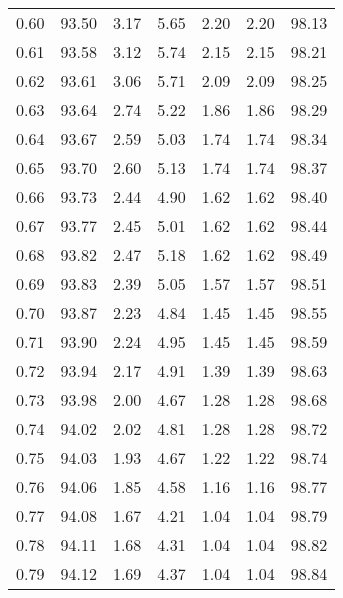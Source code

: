 \begin{tabular}{|c|c|c|c|c|c|c|}
      0.60 &     93.50 &      3.17 &       5.65 &    2.20 &       2.20 &         98.13 \\
      0.61 &     93.58 &      3.12 &       5.74 &    2.15 &       2.15 &         98.21 \\
      0.62 &     93.61 &      3.06 &       5.71 &    2.09 &       2.09 &         98.25 \\
      0.63 &     93.64 &      2.74 &       5.22 &    1.86 &       1.86 &         98.29 \\
      0.64 &     93.67 &      2.59 &       5.03 &    1.74 &       1.74 &         98.34 \\
      0.65 &     93.70 &      2.60 &       5.13 &    1.74 &       1.74 &         98.37 \\
      0.66 &     93.73 &      2.44 &       4.90 &    1.62 &       1.62 &         98.40 \\
      0.67 &     93.77 &      2.45 &       5.01 &    1.62 &       1.62 &         98.44 \\
      0.68 &     93.82 &      2.47 &       5.18 &    1.62 &       1.62 &         98.49 \\
      0.69 &     93.83 &      2.39 &       5.05 &    1.57 &       1.57 &         98.51 \\
      0.70 &     93.87 &      2.23 &       4.84 &    1.45 &       1.45 &         98.55 \\
      0.71 &     93.90 &      2.24 &       4.95 &    1.45 &       1.45 &         98.59 \\
      0.72 &     93.94 &      2.17 &       4.91 &    1.39 &       1.39 &         98.63 \\
      0.73 &     93.98 &      2.00 &       4.67 &    1.28 &       1.28 &         98.68 \\
      0.74 &     94.02 &      2.02 &       4.81 &    1.28 &       1.28 &         98.72 \\
      0.75 &     94.03 &      1.93 &       4.67 &    1.22 &       1.22 &         98.74 \\
      0.76 &     94.06 &      1.85 &       4.58 &    1.16 &       1.16 &         98.77 \\
      0.77 &     94.08 &      1.67 &       4.21 &    1.04 &       1.04 &         98.79 \\
      0.78 &     94.11 &      1.68 &       4.31 &    1.04 &       1.04 &         98.82 \\
      0.79 &     94.12 &      1.69 &       4.37 &    1.04 &       1.04 &         98.84 \\

\end{tabular}
